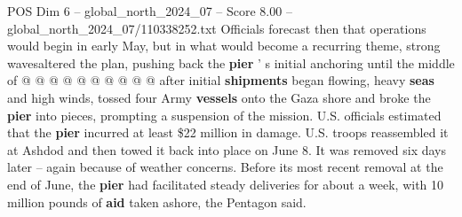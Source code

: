 \begin{textsample}{POS Dim 6 – global\_north\_2024\_07 – Score 8.00 – global\_north\_2024\_07/110338252.txt}
Officials forecast then that operations would begin in early May, but in what would become a recurring theme, strong wavesaltered the plan, pushing back the \textbf{pier} ' s initial anchoring until the middle of @ @ @ @ @ @ @ @ @ @ after initial \textbf{shipments} began flowing, heavy \textbf{seas} and high winds, tossed four Army \textbf{vessels} onto the Gaza shore and broke the \textbf{pier} into pieces, prompting a suspension of the mission.
U.S. officials estimated that the \textbf{pier} incurred at least \$22 million in damage.
U.S. troops reassembled it at Ashdod and then towed it back into place on June 8.
It was removed six days later -- again because of weather concerns.
Before its most recent removal at the end of June, the \textbf{pier} had facilitated steady deliveries for about a week, with 10 million pounds of \textbf{aid} taken ashore, the Pentagon said.

\end{textsample}
